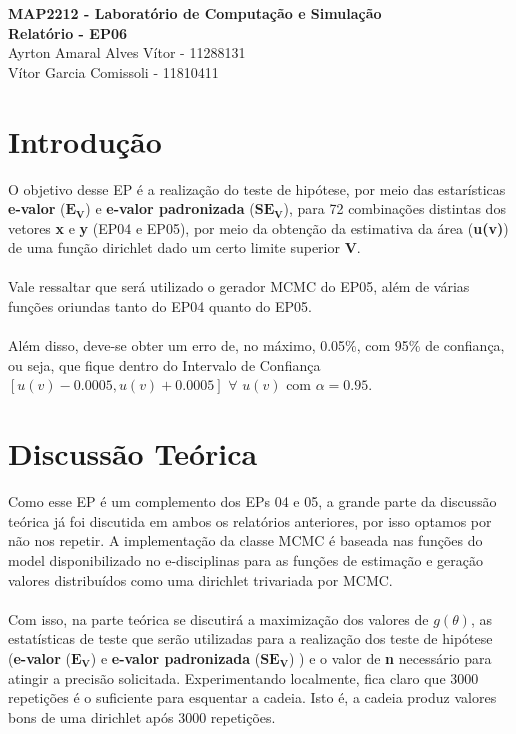 \documentclass{article}
\begin{document}
\begin{center}
    \textbf{\LARGE MAP2212 - Laboratório de Computação e Simulação}\\
    \vspace{0.3cm}
    \textbf{\Large Relatório - EP06}\\
    \vspace{0.3cm}
    \large{Ayrton Amaral Alves Vítor - 11288131}\\
    \large{Vítor Garcia Comissoli - 11810411}
\end{center}

\section{Introdução}
    
    O objetivo desse EP é a realização do teste de hipótese, por meio das estarísticas \textbf{e-valor} ($\bm{E_V}$) e  \textbf{e-valor padronizada} ($\bm{SE_V}$), para 72 combinações distintas dos vetores \textbf{x} e \textbf{y} (EP04 e EP05), por meio da obtenção da estimativa da área (\textbf{u(v)}) de uma função dirichlet dado um certo limite superior \textbf{V}.\\
    \\
    Vale ressaltar que será utilizado o gerador MCMC do EP05, além de várias funções oriundas tanto do EP04 quanto do EP05.\\
    \\
    Além disso, deve-se obter um erro de, no máximo, 0.05\%, com 95\% de confiança, ou seja, que fique dentro do Intervalo de Confiança $[u(v) - 0.0005, u(v) + 0.0005]$ $\forall$ $ u(v) $ com $ \alpha=0.95$.
    
\section{Discussão Teórica}
    
     Como esse EP é um complemento dos EPs 04 e 05, a grande parte da discussão teórica  já foi discutida em ambos os relatórios anteriores, por isso optamos por não nos repetir. A implementação da classe MCMC é baseada nas funções do model disponibilizado no e-disciplinas para as funções de estimação e geração valores distribuídos como uma dirichlet trivariada por MCMC.\\
     \\
     Com isso, na parte teórica se discutirá a maximização dos valores de $g(\theta)$, as estatísticas de teste que serão utilizadas para a realização dos teste de hipótese (\textbf{e-valor} ($\bm{E_V}$) e  \textbf{e-valor padronizada} ($\bm{SE_V}$) ) e o valor de \textbf{n} necessário para atingir a precisão solicitada. Experimentando localmente, fica claro que 3000 repetições é o suficiente para esquentar a cadeia. Isto é, a cadeia produz valores bons de uma dirichlet após 3000 repetições.
     
\end{document}
